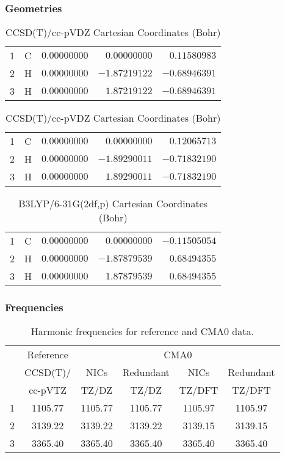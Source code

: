 \documentclass[10pt,oneside]{article}
\begin{document}
\begin{table}[h!]
\subsubsection*{Geometries}
\begin{multicols}{2}
\centering
\caption{CCSD(T)/cc-pVTZ Cartesian Coordinates (Bohr)}
\begin{tabular}{llrrr}
\toprule
1  & C  & $ 0.00000000$ & $ 0.00000000$ & $ 0.11580983$ \\
2  & H  & $ 0.00000000$ & $-1.87219122$ & $-0.68946391$ \\
3  & H  & $ 0.00000000$ & $ 1.87219122$ & $-0.68946391$ \\
\bottomrule
\end{tabular}
\caption{CCSD(T)/cc-pVDZ Cartesian Coordinates (Bohr)}
\begin{tabular}{llrrr}
\toprule
1  & C  & $ 0.00000000$ & $ 0.00000000$ & $ 0.12065713$ \\
2  & H  & $ 0.00000000$ & $-1.89290011$ & $-0.71832190$ \\
3  & H  & $ 0.00000000$ & $ 1.89290011$ & $-0.71832190$ \\
\bottomrule
\end{tabular}
\end{multicols}
\end{table}

\begin{table}[h]
\centering
\caption{B3LYP/6-31G(2df,p) Cartesian Coordinates (Bohr)}
\begin{tabular}{llrrr}
\toprule
1  & C  & $ 0.00000000$ & $ 0.00000000$ & $-0.11505054$ \\
2  & H  & $ 0.00000000$ & $-1.87879539$ & $ 0.68494355$ \\
3  & H  & $ 0.00000000$ & $ 1.87879539$ & $ 0.68494355$ \\
\bottomrule
\end{tabular}
\end{table}

\begin{table}[h!]
\subsubsection*{Frequencies}
\centering
\caption{Harmonic frequencies for reference and CMA0 data.}
\begin{tabular}{cccccc}
\toprule
{} & Reference & \multicolumn{4}{c}{CMA0} \\
{} &  CCSD(T)/ &    NICs &  Redundant &    NICs & Redundant \\
{} &   cc-pVTZ &   TZ/DZ &      TZ/DZ &  TZ/DFT &    TZ/DFT \\
\midrule
1 &   1105.77 & 1105.77 &    1105.77 & 1105.97 &   1105.97 \\
2 &   3139.22 & 3139.22 &    3139.22 & 3139.15 &   3139.15 \\
3 &   3365.40 & 3365.40 &    3365.40 & 3365.40 &   3365.40 \\
\bottomrule
\end{tabular}
\end{table}
\end{document}
